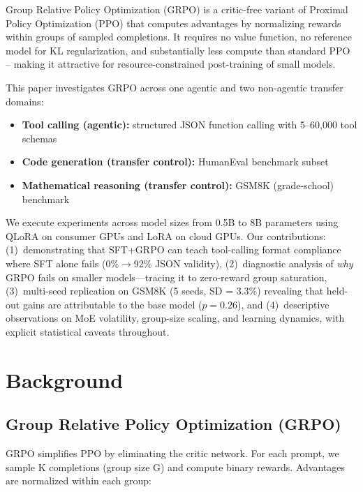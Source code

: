 \documentclass{article}
\begin{document}
Group Relative Policy Optimization (GRPO) \citep{shao2024deepseekmath} is a critic-free variant of Proximal Policy Optimization (PPO) that computes advantages by normalizing rewards within groups of sampled completions. It requires no value function, no reference model for KL regularization, and substantially less compute than standard PPO -- making it attractive for resource-constrained post-training of small models.

This paper investigates GRPO across one agentic and two non-agentic transfer domains:
\begin{itemize}
    \item \textbf{Tool calling (agentic):} structured JSON function calling with 5--60,000 tool schemas
    \item \textbf{Code generation (transfer control):} HumanEval benchmark subset
    \item \textbf{Mathematical reasoning (transfer control):} GSM8K (grade-school) benchmark
\end{itemize}

We execute experiments across model sizes from 0.5B to 8B parameters using QLoRA on consumer GPUs and LoRA on cloud GPUs. Our contributions: (1)~demonstrating that SFT+GRPO can teach tool-calling format compliance where SFT alone fails (0\%$\rightarrow$92\% JSON validity), (2)~diagnostic analysis of \emph{why} GRPO fails on smaller models---tracing it to zero-reward group saturation, (3)~multi-seed replication on GSM8K (5 seeds, SD = 3.3\%) revealing that held-out gains are attributable to the base model ($p{=}0.26$), and (4)~descriptive observations on MoE volatility, group-size scaling, and learning dynamics, with explicit statistical caveats throughout.

\section{Background}

\subsection{Group Relative Policy Optimization (GRPO)}

GRPO \citep{shao2024deepseekmath} simplifies PPO by eliminating the critic network. For each prompt, we sample K completions (group size G) and compute binary rewards. Advantages are normalized within each group:
\end{document}
